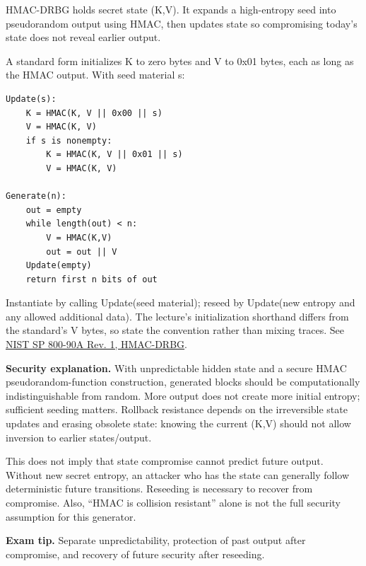 \documentclass[11pt,a4paper]{article}
\begin{document}
HMAC-DRBG holds secret state (K,\allowbreak{}V). It expands a high-entropy seed into pseudorandom output using HMAC,\allowbreak{} then updates state so compromising today’s state does not reveal earlier output.


A standard form initializes K to zero bytes and V to 0x01 bytes,\allowbreak{} each as long as the HMAC output. With seed material s:



\begin{Verbatim}[breaklines=true,breakanywhere=true,fontsize=\small,frame=single,rulecolor=\color{PanelBorder}]
Update(s):
    K = HMAC(K, V || 0x00 || s)
    V = HMAC(K, V)
    if s is nonempty:
        K = HMAC(K, V || 0x01 || s)
        V = HMAC(K, V)

Generate(n):
    out = empty
    while length(out) < n:
        V = HMAC(K,V)
        out = out || V
    Update(empty)
    return first n bits of out
\end{Verbatim}

Instantiate by calling Update(seed material); reseed by Update(new entropy and any allowed additional data). The lecture’s initialization shorthand differs from the standard’s V bytes,\allowbreak{} so state the convention rather than mixing traces. See \href{https://nvlpubs.nist.gov/nistpubs/SpecialPublications/NIST.SP.800-90Ar1.pdf}{NIST SP 800-90A Rev. 1,\allowbreak{} HMAC-DRBG}.


\textbf{Security explanation.} With unpredictable hidden state and a secure HMAC pseudorandom-function construction,\allowbreak{} generated blocks should be computationally indistinguishable from random. More output does not create more initial entropy; sufficient seeding matters. Rollback resistance depends on the irreversible state updates and erasing obsolete state: knowing the current (K,\allowbreak{}V) should not allow inversion to earlier states/\allowbreak{}output.


This does not imply that state compromise cannot predict future output. Without new secret entropy,\allowbreak{} an attacker who has the state can generally follow deterministic future transitions. Reseeding is necessary to recover from compromise. Also,\allowbreak{} “HMAC is collision resistant” alone is not the full security assumption for this generator.



{\color{ForestGreen}\textbf{Exam tip.} Separate unpredictability,\allowbreak{} protection of past output after compromise,\allowbreak{} and recovery of future security after reseeding.}
\end{document}
